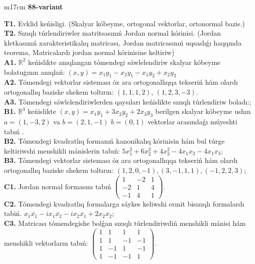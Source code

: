 \documentclass{article}
\begin{document}
\begin{tabular}{m{17cm}}
\textbf{88-variant}
\newline

\textbf{T1.} Evklid keńisligi. (Skalyar kóbeyme, ortogonal vektorlar, ortonormal bazis.) \\
\textbf{T2.} Sızıqlı túrlendiriwler matritsasınıń Jordan normal kórinisi. (Jordan kletkasınıń xarakteristikalıq matricası, Jordan matricasınıń uqsaslıǵı haqqında teorema,  Matricalardı jordan normal kórinisine keltiriw) \\
\textbf{A1.} \(\mathbb{R}^{2}\) keńislikte anıqlangan tómendegi sáwlelendiriw skalyar kóbeyme bolatuģının anıqlań: \((x,y) = x_{1}y_{1} - x_{2}y_{1} - x_{1}y_{2} + x_{2}y_{2}\) \\
\textbf{A2.} Tómendegi vektorlar sisteması óz ara ortogonallıqqa tekseriń hám olardı ortogonallıq baziske shekem toltırın: \((1,1,1,2)\), \((1,2,3, - 3)\). \\
\textbf{A3.} Tómendegi sáwlelendiriwlerden qaysıları keńislikte sızıqlı túrlendiriw boladı:; \\
\textbf{B1.} \(\mathbb{R}^{3}\) keńislikte \((x,y) = x_{1}y_{1} + 3x_{2}y_{2} + 2x_{3}y_{3}\) berilgen skalyar kóbeyme ushın \(a = (1, - 3,2)\) va \(b = (2,1, - 1)\) \(b = (0,1)\) vektorlar arasındaǵı múyeshti tabıń . \\
\textbf{B2.} Tómendegi kvadratlıq formanıń kanonikalıq kórinisin hám bul túrge keltiriwshi menshikli mánislerin tabıń: \(5x_{1}^{2} + 6x_{2}^{2} + 4x_{3}^{2} - 4x_{1}x_{2} - 4x_{1}x_{3}\); \\
\textbf{B3.} Tómendegi vektorlar sisteması óz ara ortogonallıqqa tekseriń hám olardı ortogonallıq baziske shekem toltırın: \((1,2,0, - 1),(3, - 1,1,1),( - 1,2,2,3)\); \\
\textbf{C1.} Jordan normal formasını tabıń \(\begin{pmatrix} 1 & - 2 & 1 \\  - 2 & 1 & 4 \\  - 1 & 4 & 1 \end{pmatrix}\). \\
\textbf{C2.} Tómendegi kvadratlıq formalarga sáykes keliwshi ermit bisızıqlı formalardı tabiń. \(x_{1}\overline{x_{1}} - ix_{1}\overline{x_{2}} - ix_{2}\overline{x_{1}} + 2x_{2}\overline{x_{2}}\); \\
\textbf{C3.} Matricası tómendegishe bolǵan sızıqlı túrlendiriwdiń menshikli mánisi hám menshikli vektorların tabıń: \(\begin{pmatrix} 1 & 1 & 1 & 1 \\ 1 & 1 & - 1 & - 1 \\ 1 & - 1 & 1 & - 1 \\ 1 & - 1 & - 1 & 1 \end{pmatrix}\). \\

\end{tabular}
\vspace{1cm}
\end{document}
